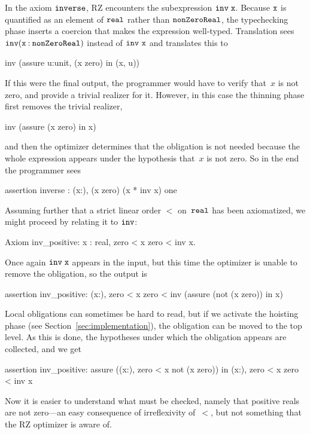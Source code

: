 In the axiom $\mathtt{inverse}$, RZ encounters the subexpression
$\mathtt{inv \;x}$. Because $\mathtt{x}$ is quantified as an element of
$\mathtt{real}$ rather than $\mathtt{nonZeroReal}$, the typechecking
phase inserts a coercion that makes the expression well-typed.
Translation sees $\mathtt{inv}(\mathtt{x} \mathbin{{:}}
\mathtt{nonZeroReal})$ instead of $\f{inv\ x}$ and translates this to
%
\begin{source}
inv (assure u:unit, \iNot (x  zero) in (x, u))
\end{source}
%
If this were the final output, the programmer would have to verify
that~$x$ is not zero, and provide a trivial realizer for it. However,
in this case the thinning phase first removes the trivial realizer,
%
\iflong
\begin{source}
inv (assure \iNot (x  zero) in x)
\end{source}
\fi %
%
and then the optimizer determines that the obligation is not needed
because the whole expression appears under the hypothesis that~$x$ is
not zero. So in the end the programmer sees
%
\begin{source}
assertion inverse :
  \iForall (x:),  \iNot (x  zero) \iTo (x * inv x)  one
\end{source}
%
Assuming further that a strict linear order $<$ on~$\mathtt{real}$ has
been axiomatized, we might proceed by relating it to $\mathtt{inv}$:
%
\begin{source}
Axiom inv_positive: \iForall x : real, zero < x \iTo zero < inv x.
\end{source}
%
Once again $\mathtt{inv\;x}$ appears in the input, but this time the
optimizer is unable to remove the obligation, so the output is
%
\begin{source}
assertion inv_positive: \iForall (x:),
   zero < x \iTo zero < inv (assure (not (x  zero)) in x)
\end{source}
%
Local obligations can sometimes be hard to read, but if we activate the hoisting phase
(see Section~\ref{sec:implementation}), the obligation can be moved
to the top level. As this is done, the hypotheses under which the
obligation appears are collected, and we get
%
\begin{source}
assertion inv_positive:
  assure (\iForall (x:),  zero < x \iTo not (x  zero))
    in \iForall (x:),  zero < x \iTo zero < inv x
\end{source}
%
Now it is easier to understand what must be checked, namely that
positive reals are not zero---an easy consequence of irreflexivity
of~$<$, but not something that the RZ optimizer is aware of.


